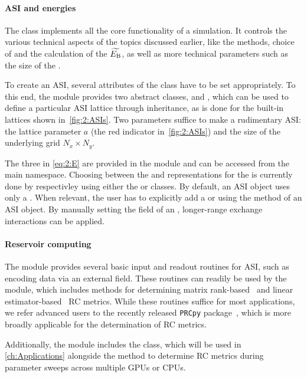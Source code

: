 \paragraph{ASI and energies}
The \textbf{} class implements all the core functionality of a simulation.
It controls the various technical aspects of the topics discussed earlier, like the  methods, choice of  and the calculation of the  $\widetilde{E_\mathrm{B}}$, as well as more technical parameters such as the size of the . \par
To create an ASI, several attributes of the  class have to be set appropriately.
To this end, the \textbf{} module provides two abstract classes,  and , which can be used to define a particular ASI lattice through inheritance, as is done for the built-in lattices shown in~\cref{fig:2:ASIs}.
Two parameters suffice to make a rudimentary ASI: the lattice parameter $a$ (the red indicator in~\cref{fig:2:ASIs}) and the size of the underlying grid $N_x \times N_y$. \par
The three  in \eqref{eq:2:E} are provided in the \textbf{} module and can be accessed from the main  namespace.
Choosing between the  and  representations for the  is currently done by respectivley using either the  or  classes.
By default, an ASI object uses only a .
When relevant, the user has to explicitly add a  or  using the  method of an ASI object.
By manually setting the  field of an , longer-range exchange interactions can be applied.

\paragraph{Reservoir computing} %
The  module provides several basic input and readout routines for ASI, such as encoding data via an external field.
These routines can readily be used by the  module, which includes methods for determining matrix rank-based~\cite{RC_ASI} and linear estimator-based~\cite{RC_TaskAgnosticMetrics_v2} RC metrics.
While these routines suffice for most applications, we refer advanced users to the recently released \texttt{PRCpy} package~\cite{PRCpy}, which is more broadly applicable for the determination of RC metrics. \par
Additionally, the  module includes the
 class, which will be used in \cref{ch:Applications} alongside the  method to determine RC metrics during parameter sweeps across multiple GPUs or CPUs.

